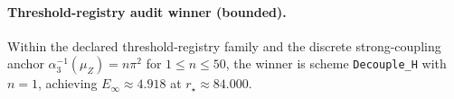 \paragraph{Threshold-registry audit winner (bounded).}
\AuditTag Within the declared threshold-registry family and the discrete strong-coupling anchor $\alpha_3^{-1}(\mu_Z)=n\pi^2$ for $1\le n\le 50$, the winner is scheme \texttt{Decouple\_H} with $n=1$, achieving $E_\infty\approx 4.918$ at $r_\star\approx 84.000$.
